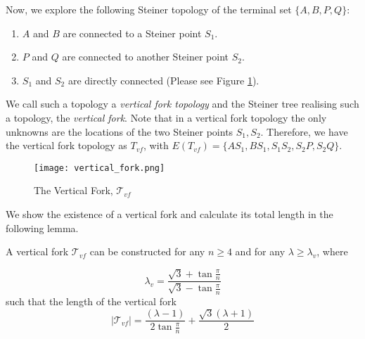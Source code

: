 Now, we explore the following Steiner topology of the terminal set $\{A, B, P, Q\}$:
\begin{enumerate}
\item $A$ and $B$ are connected to a Steiner point $S_1$.
\item $P$ and $Q$ are connected to another Steiner point $S_2$. 
\item $S_1$ and $S_2$ are directly connected (Please see Figure \ref{T_vf}). 
\end{enumerate}
We call such a topology a \emph{vertical fork topology} and the Steiner tree realising such a topology, the \emph{vertical fork}. Note that in a vertical fork topology the only unknowns are the locations of the two Steiner points $S_1,S_2$. Therefore, we have the vertical fork topology as $T_{vf}$, with $E(T_{vf}) = \{AS_1, BS_1, S_1S_2, S_2P, S_2Q\}$.


\begin{figure}[h]
\centering
\texttt{[image: vertical\_fork.png]}
\caption{The Vertical Fork, $\mathcal T_{vf}$}
\label{T_vf}
\end{figure}




We show the existence of a vertical fork and calculate its total length in the following lemma.

\begin{lemma} \label{lambda_v}
A vertical fork $\mathcal T_{vf}$ can be constructed for any $n \ge 4$ and for any $\lambda \ge \lambda_v$, where

$$\lambda_v = \frac {\sqrt 3 + \tan{ \frac \pi n }} {\sqrt 3 - \tan{ \frac \pi n}}$$    
such that the length of the vertical fork   
$$|\mathcal T_{vf}| = \dfrac{(\lambda - 1)}{2 \tan \frac \pi n} + \dfrac {\sqrt 3 (\lambda + 1)} {2}$$

\end{lemma}

